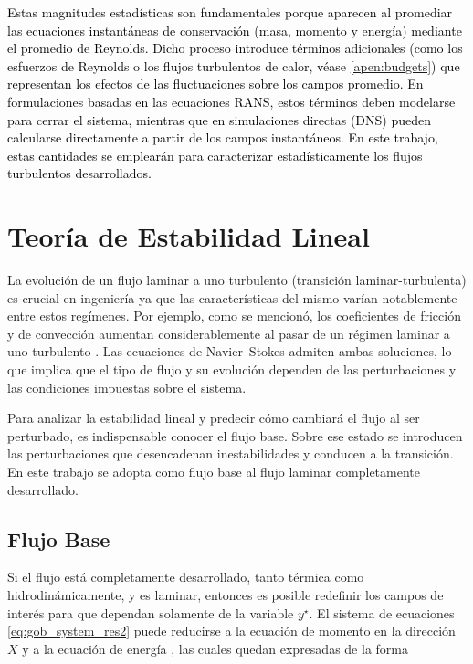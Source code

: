 \textcolor{black}{Estas magnitudes estadísticas son fundamentales porque aparecen al promediar las ecuaciones instantáneas de conservación (masa, momento y energía) mediante el promedio de Reynolds. Dicho proceso introduce términos adicionales (como los esfuerzos de Reynolds o los flujos turbulentos de calor, véase \ref{apen:budgets}) que representan los efectos de las fluctuaciones sobre los campos promedio. En formulaciones basadas en las ecuaciones RANS, estos términos deben modelarse para cerrar el sistema, mientras que en simulaciones directas (DNS) pueden calcularse directamente a partir de los campos instantáneos. En este trabajo, estas cantidades se emplearán para caracterizar estadísticamente los flujos turbulentos desarrollados.}


\section{Teoría de Estabilidad Lineal} \label{line_an}

La evolución de un flujo laminar a uno turbulento (transición laminar-turbulenta) es crucial en ingeniería ya que las características del mismo varían notablemente entre estos regímenes. Por ejemplo, como se mencionó, los coeficientes de fricción y de convección aumentan considerablemente al pasar de un régimen laminar a uno turbulento \cite{machaca2024}. Las ecuaciones de Navier–Stokes admiten ambas soluciones, lo que implica que el tipo de flujo y su evolución dependen de las perturbaciones y las condiciones impuestas sobre el sistema. 

Para analizar la estabilidad lineal y predecir cómo cambiará el flujo al ser perturbado, es indispensable conocer el flujo base. Sobre ese estado se introducen las perturbaciones que desencadenan inestabilidades y conducen a la transición. En este trabajo se adopta como flujo base al flujo laminar completamente desarrollado. 


\subsection{Flujo Base} \label{sec:fbase}

Si el flujo está completamente desarrollado, tanto térmica como hidrodinámicamente, y es laminar, entonces es posible redefinir los campos de interés para que dependan solamente de la variable $y^{\star}$. El sistema de ecuaciones \ref{eq:gob_system_res2} puede reducirse a la ecuación de momento en la dirección $X$ y a la ecuación de energía \cite{chen1996linear}, las cuales quedan expresadas de la forma 

